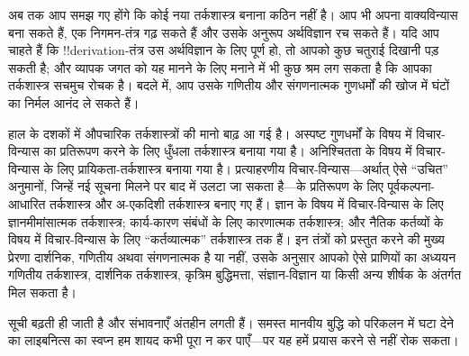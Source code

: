 \documentclass[../../../include/open-logic-section]{subfiles}
\begin{document}


अब तक आप समझ गए होंगे कि कोई नया तर्कशास्त्र बनाना कठिन नहीं है। आप भी अपना
वाक्यविन्यास बना सकते हैं, एक निगमन-तंत्र गढ़ सकते हैं और उसके अनुरूप
अर्थविज्ञान रच सकते हैं। यदि आप चाहते हैं कि !!{derivation}-तंत्र उस
अर्थविज्ञान के लिए पूर्ण हो, तो आपको कुछ चतुराई दिखानी पड़ सकती है; और
व्यापक जगत को यह मानने के लिए मनाने में भी कुछ श्रम लग सकता है कि आपका
तर्कशास्त्र सचमुच रोचक है। बदले में, आप उसके गणितीय और संगणनात्मक गुणधर्मों
की खोज में घंटों का निर्मल आनंद ले सकते हैं।

हाल के दशकों में औपचारिक तर्कशास्त्रों की मानो बाढ़ आ गई है। अस्पष्ट
गुणधर्मों के विषय में विचार-विन्यास का प्रतिरूपण करने के लिए धुँधला
तर्कशास्त्र बनाया गया है। अनिश्चितता के विषय में विचार-विन्यास के लिए
प्रायिकता-तर्कशास्त्र बनाया गया है। प्रत्याहरणीय विचार-विन्यास---अर्थात्
ऐसे ``उचित'' अनुमानों, जिन्हें नई सूचना मिलने पर बाद में उलटा जा सकता
है---के प्रतिरूपण के लिए पूर्वकल्पना-आधारित तर्कशास्त्र और अ-एकदिशी
तर्कशास्त्र बनाए गए हैं। ज्ञान के विषय में विचार-विन्यास के लिए
ज्ञानमीमांसात्मक तर्कशास्त्र; कार्य-कारण संबंधों के लिए कारणात्मक
तर्कशास्त्र; और नैतिक कर्तव्यों के विषय में विचार-विन्यास के लिए
``कर्तव्यात्मक'' तर्कशास्त्र तक हैं। इन तंत्रों को प्रस्तुत करने की मुख्य
प्रेरणा दार्शनिक, गणितीय अथवा संगणनात्मक है या नहीं, उसके अनुसार आपको ऐसे
प्राणियों का अध्ययन गणितीय तर्कशास्त्र, दार्शनिक तर्कशास्त्र, कृत्रिम
बुद्धिमत्ता, संज्ञान-विज्ञान या किसी अन्य शीर्षक के अंतर्गत मिल सकता है।

सूची बढ़ती ही जाती है और संभावनाएँ अंतहीन लगती हैं। समस्त मानवीय बुद्धि को
परिकलन में घटा देने का लाइबनित्स का स्वप्न हम शायद कभी पूरा न कर पाएँ---पर
यह हमें प्रयास करने से नहीं रोक सकता।
\end{document}
